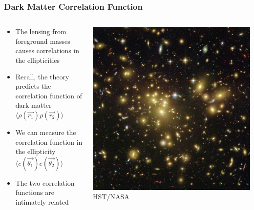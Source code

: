 \documentclass{beamer}
\begin{document}
\frame
{

    \frametitle{Dark Matter Correlation Function}


    \begin{columns}
        \begin{column}{0.5\textwidth}
            \begin{itemize}

                \item The lensing from foreground masses
                    causes correlations in the ellipticities

                \item Recall, the theory predicts the correlation function of
                    dark matter {\color{gold} $\langle \rho(\vec{r_1}) \rho(\vec{r_2})
                    \rangle$ }

                \item We can measure the correlation function in the
                    ellipticity {\color{gold} $\langle e(\vec{\theta_1})
                    e(\vec{\theta_2}) \rangle$ }

                \item The two correlation functions are intimately related

            \end{itemize}

        \end{column}
        \begin{column}{0.5\textwidth}
            \begin{center}
                \includegraphics[width=\textwidth]{abell-1689-hubble.jpg}
                \newline
                {\tiny HST/NASA}
            \end{center}
        \end{column}


\end{columns}}
\end{document}
